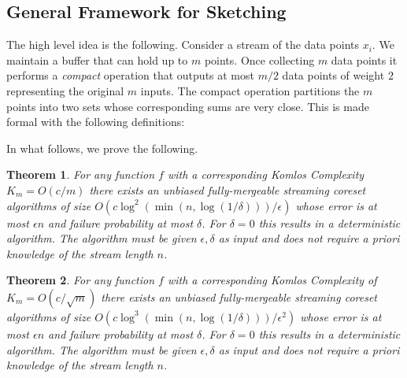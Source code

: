 \documentclass{article} %
\newtheorem{theorem}{Theorem}[section]
\newtheorem{fact}[theorem]{Fact}
\newcommand{\eps}{\epsilon}
\begin{document}
\subsection{General Framework for Sketching}


The high level idea is the following. 
Consider a stream of the data points $x_i$. 
We maintain a buffer that can hold up to $m$ points.
Once collecting $m$ data points it performs a \emph{compact} operation that outputs at most $m/2$ data points of weight $2$ representing the original $m$ inputs. The compact operation partitions the $m$ points into two sets whose corresponding sums are very close. 
This is made formal with the following definitions: 

In what follows, we prove the following.
\begin{theorem} \label{thm:streaming}
For any function $f$ with a corresponding Komlos Complexity $K_m = O(c/m)$ there exists an unbiased fully-mergeable streaming coreset algorithms of size 
$O\left(c\log^2\left(\min(n, \log(1/\delta)) \right)/\eps\right)$ whose error is at most $\eps n$ and failure probability at most $\delta$. For $\delta=0$ this results in a deterministic algorithm. The algorithm must be given $\eps, \delta$ as input and does not require a priori knowledge of the stream length $n$.
\end{theorem}


\begin{theorem}
For any function $f$ with a corresponding Komlos Complexity of $K_m = O(c/\sqrt{m})$ there exists an unbiased fully-mergeable streaming coreset algorithms of size 
$O\left(c\log^3\left(\min(n, \log(1/\delta)) \right)/\eps^2\right)$ whose error is at most $\eps n$ and failure probability at most $\delta$. For $\delta=0$ this results in a deterministic algorithm. The algorithm must be given $\eps, \delta$ as input and does not require a priori knowledge of the stream length $n$.
\end{theorem}
%
%
\end{document}
